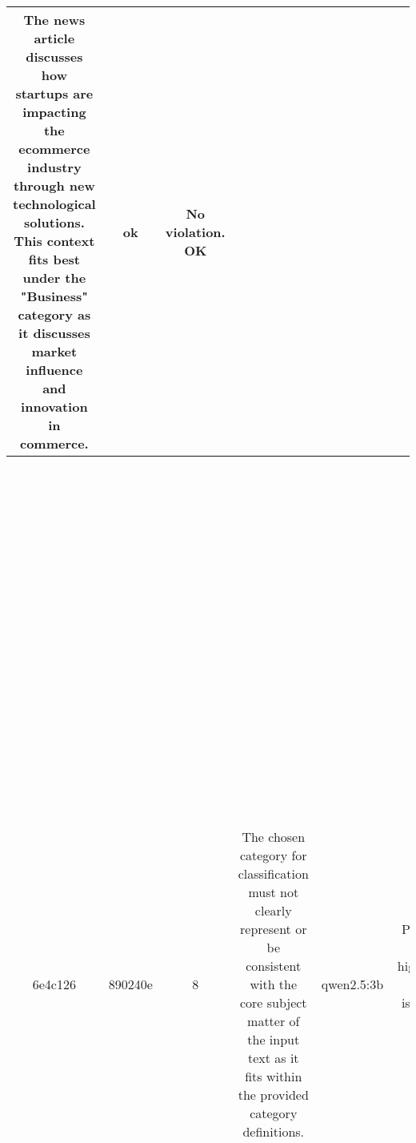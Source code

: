 \begin{table}[h!]
\begin{tabular}{|c|c|c|c|c|c|c|c|c|c|}
The news article discusses how startups are impacting the ecommerce industry through new technological solutions. This context fits best under the "Business" category as it discusses market influence and innovation in commerce. & ok & No violation.
OK & \\
\hline
6e4c126 & 890240e & 8 & The chosen category for classification must not clearly represent or be consistent with the core subject matter of the input text as it fits within the provided category definitions. & qwen2.5:3b & Political satire highlights social issues in viral video & This news article would be best classified under the category **World**. The statement refers to a phenomenon that involves political commentary through a medium (likely video) which touches on societal and possibly political issues, making it relevant to global news coverage. While it could fall into any of the four given categories, "World" is the most appropriate as it encompasses political and social issues happening worldwide. & ok & The chatbot output classifies a news article under the 'World' category. The description specifies the available categories are World, Sports, Business, and Sci/Tech, and the output provides a classification within that range. The output explicitly mentions the 'World' category and provides justification based on the involvement of political commentary on societal and possibly political issues relevant to global news coverage. There is no information in the output that violates any of the set rules from the description.

No violation.
OK & \\
\hline
8571962 & 890240e &  &  & qwen2.5:3b & text: "Olympics 2024 set to break records with new sporting events" & The given text "Olympics 2024 set to break records with new sporting events" would be classified under the category **Sports**. This is because it mentions the Olympics, which are a major sporting event. & ok & No violation. The chatbot output classifies the news article under the **Sports** category, which aligns with the description's example of a sports-related headline mentioning "Ronaldo scores twice in Manchester United return." The category assignment does not violate the description guidelines.


\end{tabular}
\end{table}
